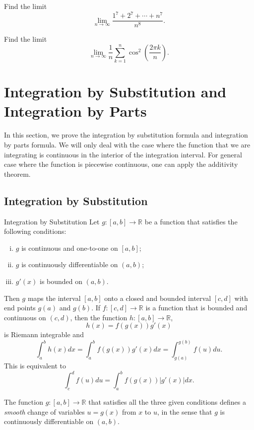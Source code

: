 \begin{example}[label=20230527]{}
\begin{question}{\themyquestion}
\end{question}
\atc


 \begin{question}{\themyquestion}
Find the limit 
\[\lim_{n\to\infty}\frac{1^7+2^7+\cdots+n^7}{n^8}.\]
\end{question}
\atc
 \begin{question}{\themyquestion}
Find the limit 
\[\lim_{n\to\infty}\frac{1}{n}\sum_{k=1}^n\cos^2\left(\frac{2\pi k}{n}\right).\]
\end{question}
\vp





\section{Integration by Substitution and Integration by Parts}\label{sec4.5}


In this section, we prove the integration by substitution formula and integration by parts formula. We will only deal with the case where the function that we are integrating is continuous in the interior of the integration interval. For general case where the function is piecewise continuous, one can apply the additivity theorem.

\subsection{Integration by Substitution}
\begin{theorem}[label=230223_5]{Integration by Substitution}
Let  $g:[a,b]\to\mathbb{R}$ be a function that satisfies the following conditions:
\begin{enumerate}[(i)]
\item $g$ is continuous and one-to-one on $[a,b]$;
\item $g$  is continuously differentiable on $(a,b)$;
\item $g'(x)$ is bounded on $(a,b)$.
\end{enumerate}  Then $g  $ maps the interval $[a,b]$ onto  a closed and bounded interval $[c,d]$ with end points $g(a)$ and $g(b)$.   If $f:[c,d]\to\mathbb{R}$ is a   function that is   bounded and continuous on $(c,d)$, then the function $h:[a,b]\to \mathbb{R}$,
\[h(x)=f(g(x))g'(x)\]is  Riemann integrable and
\begin{equation}\label{eq230223_1}\int_a^bh(x)dx=\int_a^b f(g(x))g'(x)dx=\int_{g(a)}^{g(b)}f(u)du.\end{equation}
This is equivalent to
\begin{equation}\label{eq230223_2}\int_c^d f(u)du=\int_a^bf(g(x))|g'(x)|dx.\end{equation}
\end{theorem}
The function $g:[a,b]\to\mathbb{R}$ that satisfies all the three given conditions defines  a \emph{smooth} change of variables $u=g(x)$ from $x$ to $u$, in the sense that $g$ is continuously differentiable on $(a,b)$. 


\end{example}
